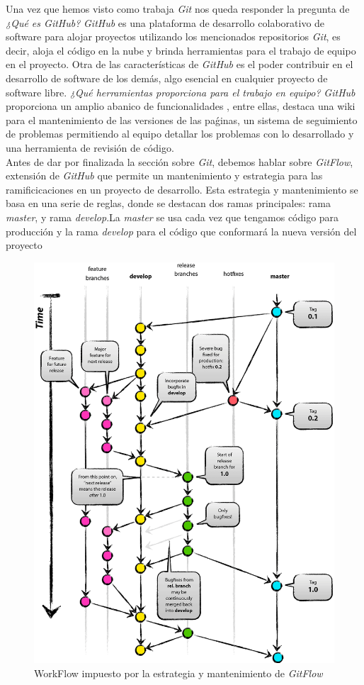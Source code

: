 Una vez que hemos visto como trabaja \emph{Git} nos queda responder la pregunta de \textit{¿Qué es GitHub?} \emph{GitHub} es una plataforma de desarrollo colaborativo de software para alojar proyectos utilizando los mencionados repositorios \emph{Git}, es decir, aloja el código en la nube y brinda herramientas para el trabajo de equipo en el proyecto. Otra de las características de \emph{GitHub} es el poder contribuir en el desarrollo de software de los demás, algo esencial en cualquier proyecto de software libre. \textit{¿Qué herramientas proporciona para el trabajo en equipo?} \emph{GitHub} proporciona un amplio abanico de funcionalidades , entre ellas, destaca una wiki para el mantenimiento de las versiones de las paǵinas, un sistema de seguimiento de problemas permitiendo al equipo detallar los problemas con lo desarrollado y una herramienta de revisión de código. \\
Antes de dar por finalizada la sección sobre \emph{Git}, debemos hablar sobre \emph{GitFlow}, extensión de \emph{GitHub} que permite un mantenimiento y estrategia para las ramificicaciones en un proyecto de desarrollo. Esta estrategia y mantenimiento se basa en una serie de reglas, donde se destacan dos ramas principales: rama \textit{master}, y rama \textit{develop}.La \textit{master} se usa cada vez que tengamos código para producción y la rama \textit{develop} para el código que conformará la nueva versión del proyecto \\
\begin{figure}[H]
    \centering
    \includegraphics[scale=0.2]{img/git_flow.png}
    \caption{WorkFlow impuesto por la estrategia y mantenimiento de \emph{GitFlow}}
    \label{fig:gitFlow}
\end{figure}
